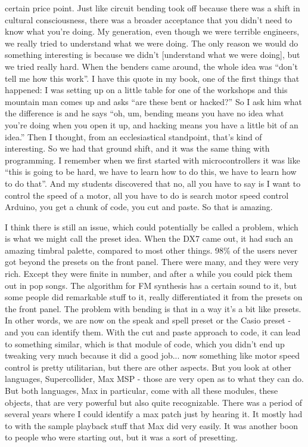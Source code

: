 certain price point. Just like circuit bending took off because there was a shift in cultural consciousness, there was a broader acceptance that you didn’t need to know what you’re doing. My generation, even though we were terrible engineers, we really tried to understand what we were doing. The only reason we would do something interesting is because we didn’t [understand what we were doing], but we tried really hard. When the benders came around, the whole idea was ``don’t tell me how this work''. I have this quote in my book, one of the first things that happened: I was setting up on a little table for one of the workshops and this mountain man comes up and asks ``are these bent or hacked?'' So I ask him what the difference is and he says ``oh, um, bending means you have no idea what you’re doing when you open it up, and hacking means you have a little bit of an idea.'' Then I thought, from an ecclesiastical standpoint, that’s kind of interesting. So we had that ground shift, and it was the same thing with programming. I remember when we first started with microcontrollers it was like ``this is going to be hard, we have to learn how to do this, we have to learn how to do that''. And my students discovered that no, all you have to say is I want to control the speed of a motor, all you have to do is search motor speed control Arduino, you get a chunk of code, you cut and paste. So that is amazing.
					
I think there is still an issue, which could potentially be called a problem, which is what we might call the preset idea. When the DX7 came out, it had such an amazing timbral palette, compared to most other things. 98\% of the users never got beyond the presets on the front panel. There were many, and they were very rich. Except they were finite in number, and after a while you could pick them out in pop songs. The algorithm for FM synthesis has a certain sound to it, but some people did remarkable stuff to it, really differentiated it from the presets on the front panel. The problem with bending is that in a way it’s a bit like presets. In other words, we are now on the speak and spell preset or the Casio preset - and you can identify them. With the cut and paste approach to code, it can lead to something similar, which is that module of code, which you didn’t end up tweaking very much because it did a good job... now something like motor speed control is pretty utilitarian, but there are other aspects. But you look at other languages, Supercollider, Max MSP - those are very open as to what they can do. But both languages, Max in particular, come with all these modules, these objects, that are very powerful but also quite recognizable. There was a period of several years where I could identify a max patch just by hearing it. It mostly had to with the sample playback stuff that Max did very easily. It was another boon to people who were starting out, but it was a sort of presetting.
					
